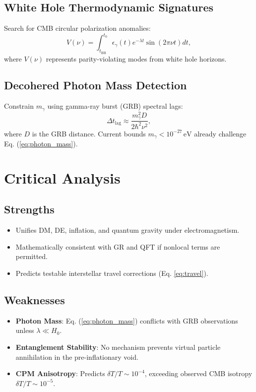 \documentclass[12pt, a4paper]{article}
\begin{document}
\subsection{White Hole Thermodynamic Signatures}
Search for CMB circular polarization anomalies:
\begin{equation}
V(\nu) = \int_{t_{\text{BB}}}^{t_0} \epsilon_{\gamma}(t) e^{-\lambda t} \sin\left(2\pi \nu t \right) dt, \label{eq:polarization}
\end{equation}
where \( V(\nu) \) represents parity-violating modes from white hole horizons.

\subsection{Decohered Photon Mass Detection}
Constrain \( m_{\gamma} \) using gamma-ray burst (GRB) spectral lags:
\begin{equation}
\Delta t_{\text{lag}} \approx \frac{m_{\gamma}^2 D}{2\hbar^2 \nu^2}, \label{eq:grb}
\end{equation}
where \( D \) is the GRB distance. Current bounds \( m_{\gamma} < 10^{-27} \, \text{eV} \) already challenge Eq. (\ref{eq:photon_mass}).

\section{Critical Analysis}
\subsection{Strengths}
\begin{itemize}
\item Unifies DM, DE, inflation, and quantum gravity under electromagnetism.
\item Mathematically consistent with GR and QFT if nonlocal terms are permitted.
\item Predicts testable interstellar travel corrections (Eq. \ref{eq:travel}).
\end{itemize}

\subsection{Weaknesses}
\begin{itemize}
\item \textbf{Photon Mass}: Eq. (\ref{eq:photon_mass}) conflicts with GRB observations unless \( \lambda \ll H_0 \).
\item \textbf{Entanglement Stability}: No mechanism prevents virtual particle annihilation in the pre-inflationary void.
\item \textbf{CPM Anisotropy}: Predicts \( \delta T/T \sim 10^{-4} \), exceeding observed CMB isotropy \( \delta T/T \sim 10^{-5} \).
\end{itemize}
\end{document}
